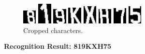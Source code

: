 \documentclass{article}
\begin{document}
\begin{spacing}{1.0}
\begin{itemize}
	\begin{figure}[H]
		\centering
		\begin{minipage}{0.7cm}
			\includegraphics[width=0.7cm]{P1010003_0.jpg}
		\end{minipage}
		\begin{minipage}{0.7cm}
			\includegraphics[width=0.7cm]{P1010003_1.jpg}
		\end{minipage}
		\begin{minipage}{0.7cm}
			\includegraphics[width=0.7cm]{P1010003_2.jpg}
		\end{minipage}
		\begin{minipage}{0.7cm}
			\includegraphics[width=0.7cm]{P1010003_3.jpg}
		\end{minipage}
		\begin{minipage}{0.7cm}
			\includegraphics[width=0.7cm]{P1010003_4.jpg}
		\end{minipage}
		\begin{minipage}{0.7cm}
			\includegraphics[width=0.7cm]{P1010003_5.jpg}
		\end{minipage}
		\begin{minipage}{0.7cm}
			\includegraphics[width=0.7cm]{P1010003_6.jpg}
		\end{minipage}
			\begin{minipage}{0.7cm}
			\includegraphics[width=0.7cm]{P1010003_7.jpg}
		\end{minipage}
		\caption{Cropped characters.}
	\end{figure}
	\textbf{Recognition Result: 819KXH75}
	

\end{itemize}
\end{spacing}
\end{document}
